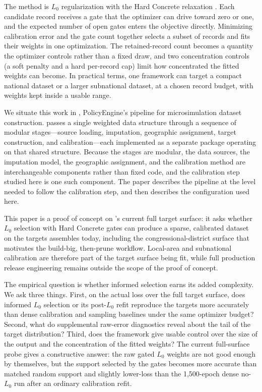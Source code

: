 The method is $L_0$ regularization with the Hard Concrete relaxation \citep{louizos2018}. Each
candidate record receives a gate that the optimizer can drive toward zero or one, and the expected
number of open gates enters the objective directly. Minimizing calibration error and the gate count
together selects a subset of records and fits their weights in one optimization. The retained-record
count becomes a quantity the optimizer controls rather than a fixed draw, and two concentration
controls (a soft penalty and a hard per-record cap) limit how concentrated the fitted weights can
become. In practical terms, one framework can target a compact national dataset or a larger subnational
dataset, at a chosen record budget, with weights kept inside a usable range.

We situate this work in \microcosm{} \citep{populace2026}, PolicyEngine's pipeline for microsimulation
dataset construction. \microcosm{} passes a single weighted data structure through a sequence of
modular stages---source loading, imputation, geographic assignment, target construction, and
calibration---each implemented as a separate package operating on that shared structure. Because the
stages are modular, the data sources, the imputation model, the geographic assignment, and the
calibration method are interchangeable components rather than fixed code, and the calibration step
studied here is one such component. The paper describes the pipeline at the level needed to follow the
calibration step, and then describes the configuration used here.

This paper is a proof of concept on \microcosm{}'s current full target surface: it asks whether
$L_0$ selection with Hard Concrete gates can produce a sparse, calibrated dataset on the targets
\microcosm{} assembles today, including the congressional-district surface that motivates the build-big,
then-prune workflow. Local-area and subnational calibration are therefore part of the target surface being
fit, while full production release engineering remains outside the scope of the proof of concept.

The empirical question is whether informed selection earns its added complexity. We ask three
things. First, on the actual \microcosm{} loss over the full target surface, does informed $L_0$ selection
or its post-$L_0$ refit reproduce the targets more accurately than dense calibration and sampling
baselines under the same optimizer budget? Second, what do supplemental raw-error diagnostics reveal about
the tail of the target distribution? Third, does the framework give usable control over the size of the
output and the concentration of the fitted weights? The current full-surface probe gives a constructive
answer: the raw gated $L_0$ weights are not good enough by themselves, but the support selected by the
gates becomes more accurate than matched random support and slightly lower-loss than the 1{,}500-epoch
dense no-$L_0$ run after an ordinary calibration refit.

